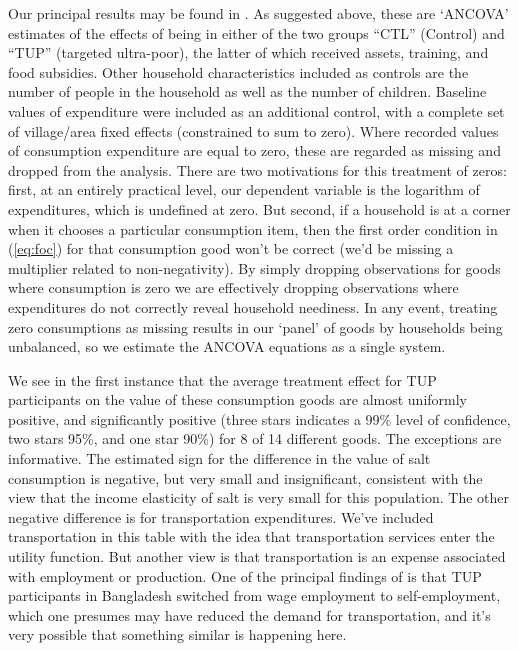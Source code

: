 \documentclass[12pt,letterpaper]{article}
\newcommand{\Eq}[1]{(\ref{eq:#1})}
\begin{document}
Our principal results may be found in .  As
suggested above, these are `ANCOVA' estimates of the effects of being
in either of the two groups ``CTL'' (Control) and ``TUP'' (targeted
ultra-poor), the latter of which received assets, training, and food
subsidies.  Other household characteristics included as controls
are the number of people in the household as well as the number of
children.  Baseline values of expenditure were included as an
additional control, with a complete set of village/area fixed effects
(constrained to sum to zero).  Where recorded values of consumption
expenditure are equal to zero, these are regarded as missing and
dropped from the analysis.  There are two motivations for this
treatment of zeros: first, at an entirely practical level, our
dependent variable is the logarithm of expenditures, which is
undefined at zero.  But second, if a household is at a corner when it
chooses a particular consumption item, then the first order condition
in \Eq{foc} for that consumption good won't be correct (we'd be
missing a multiplier related to non-negativity).  By simply dropping
observations for goods where consumption is zero we are effectively
dropping observations where expenditures do not correctly reveal
household neediness.  In any event, treating zero consumptions as
missing results in our `panel' of goods by households being
unbalanced, so we estimate the ANCOVA equations as a single system.

We see in the first instance that the average treatment effect for TUP
participants on the value of these consumption goods are almost
uniformly positive, and significantly positive (three stars indicates
a 99\% level of confidence, two stars 95\%, and one star 90\%) for 8 of
14 different goods.  The exceptions are informative.  The estimated
sign for the difference in the value of salt consumption is negative,
but very small and insignificant, consistent with the view that the
income elasticity of salt is very small for this population.  The
other negative difference is for transportation expenditures.  We've
included transportation in this table with the idea that
transportation services enter the utility function.  But another view
is that transportation is an expense associated with employment or
production.  One of the principal findings of \cite{bandiera-etal15}
is that TUP participants in Bangladesh switched from wage employment
to self-employment, which one presumes may have reduced the demand for
transportation, and it's very possible that something similar is
happening here.
\end{document}
